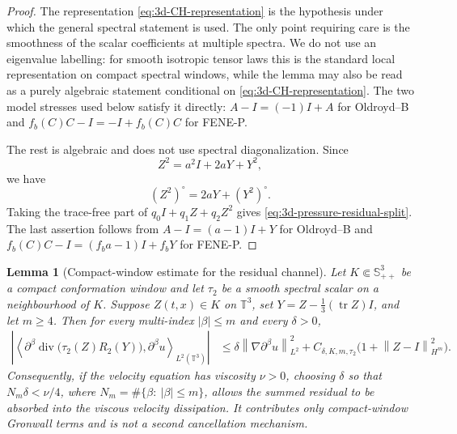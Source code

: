 \documentclass[11pt]{article}
\newtheorem{lemma}{Lemma}[section]
\newcommand{\T}{\mathbb T}
\newcommand{\Spp}{\mathbb S_{++}}
\newcommand{\tr}{\operatorname{tr}}
\newcommand{\divv}{\operatorname{div}}
\newcommand{\norm}[1]{\left\lVert #1\right\rVert}
\begin{document}
\begin{proof}
The representation \eqref{eq:3d-CH-representation} is the hypothesis under
which the general spectral statement is used.  The only point requiring care is
the smoothness of the scalar coefficients at multiple spectra.  We do not use an
eigenvalue labelling: for smooth isotropic tensor laws this is the standard
local representation on compact spectral windows, while the lemma may also be
read as a purely algebraic statement conditional on
\eqref{eq:3d-CH-representation}.  The two model stresses used below satisfy it
directly: \(A-I=(-1)I+A\) for Oldroyd--B and
\(f_b(C)C-I=-I+f_b(C)C\) for FENE-P.

The rest is algebraic and does not use spectral diagonalization.  Since
\[
  Z^2=a^2I+2aY+Y^2,
\]
we have
\[
  (Z^2)^\circ=2aY+(Y^2)^\circ .
\]
Taking the trace-free part of \(q_0I+q_1Z+q_2Z^2\) gives
\eqref{eq:3d-pressure-residual-split}.  The last assertion follows from
\(A-I=(a-1)I+Y\) for Oldroyd--B and
\(f_b(C)C-I=(f_ba-1)I+f_bY\) for FENE-P.
\end{proof}

\begin{lemma}[Compact-window estimate for the residual channel]
\label{lem:3d-residual-estimate}
Let \(K\Subset\Spp^3\) be a compact conformation window and let
\(\tau_2\) be a smooth spectral scalar on a neighbourhood of \(K\).  Suppose
\(Z(t,x)\in K\) on \(\T^3\), set \(Y=Z-\frac13(\tr Z)I\), and let
\(m\ge4\).  Then for every multi-index \(|\beta|\le m\) and every
\(\delta>0\),
\[
\begin{aligned}
  \left|\left\langle
  \partial^\beta\divv\bigl(\tau_2(Z)R_2(Y)\bigr),
  \partial^\beta u\right\rangle_{L^2(\T^3)}\right|
  &\le
  \delta\norm{\nabla\partial^\beta u}_{L^2}^2
  +C_{\delta,K,m,\tau_2}\bigl(1+\norm{Z-I}_{H^m}^2\bigr).
\end{aligned}
\]
Consequently, if the velocity equation has viscosity \(\nu>0\), choosing
\(\delta\) so that \(N_m\delta<\nu/4\), where
\(N_m=\#\{\beta:\ |\beta|\le m\}\), allows the summed residual to be absorbed
into the viscous velocity dissipation.  It contributes only compact-window
Gronwall terms and is not a second cancellation mechanism.
\end{lemma}
\end{document}
